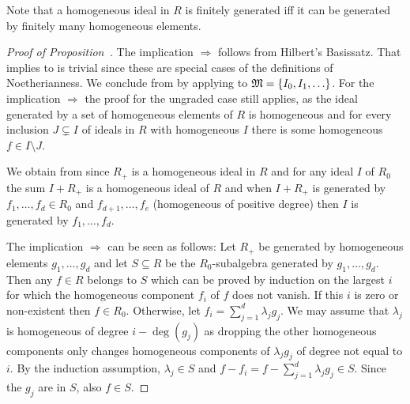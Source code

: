 \documentclass[a4paper,parskip=half,numbers=enddot, DIV=12]{scrreprt}
\begin{document}
\begin{rem}
    Note that a homogeneous ideal in $R$ is finitely generated iff it can be generated by finitely many homogeneous elements.
\end{rem}
\begin{proof}[Proof of Proposition~]
    The implication  $\Rightarrow$  follows from Hilbert's Basissatz. That  implies  to  is trivial since these are special cases of the definitions of Noetherianness. We conclude  from  by applying  to $\mathfrak{M}=\{I_0,I_1,\ldots\}$. For the implication  $\Rightarrow$  the proof for the ungraded case still applies, as the ideal generated by a set of homogeneous elements of $R$ is homogeneous and for every inclusion $J\subsetneq I$ of ideals in $R$ with homogeneous $I$ there is some homogeneous $f\in I\setminus J$.
    
    We obtain  from  since $R_+$ is a homogeneous ideal in $R$ and for any ideal $I$ of $R_0$ the sum $I+R_+$ is a homogeneous ideal of $R$ and when $I+R_+$ is generated by $f_1,\ldots, f_d\in R_0$ and $f_{d+1},\ldots,f_e$ (homogeneous of positive degree) then $I$ is generated by $f_1,\ldots, f_d$.
    
    The implication  $\Rightarrow$  can be seen as follows: Let $R_+$ be generated by homogeneous elements $g_1,\ldots, g_d$ and let $S\subseteq R$ be the $R_0$-subalgebra generated by $g_1,\ldots, g_d$. Then any $f\in R$ belongs to $S$ which can be proved by induction on the largest $i$ for which the homogeneous component $f_i$ of $f$ does not vanish. If this $i$ is zero or non-existent then $f\in R_0$. Otherwise, let $f_i = \sum_{j=1}^d \lambda_jg_j$. We may assume that $\lambda_j$ is homogeneous of degree $i-\deg(g_j)$ as dropping the other homogeneous components only changes homogeneous components of $\lambda_j g_j$ of degree not equal to $i$. By the induction assumption, $\lambda_j\in S$ and $f-f_i = f-\sum_{j=1}^d\lambda_j g_j\in S$. Since the $g_j$ are in $S$, also $f\in S$.
\end{proof}
\end{document}
